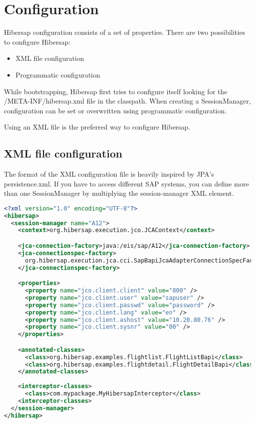 
\chapter{Configuration}
\label{cha:Configuration}

Hibersap configuration consists of a set of properties. 
There are two possibilities to configure Hibersap: 
\begin{itemize}
  \item XML file configuration 
  \item Programmatic configuration
\end{itemize}

While bootstrapping, Hibersap first tries to configure itself looking for the /META-INF/hibersap.xml file in the
classpath. When creating a SessionManager, configuration can be set or overwritten using programmatic configuration.

Using an XML file is the preferred way to configure Hibersap.


\section{XML file configuration}
\label{sec:XML file configuration}

The format of the XML configuration file is heavily inspired by JPA's persistence.xml.
If you have to access different SAP systems, you can define more than one SessionManager by multiplying the
session-manager XML element.

\begin{lstlisting}[language=XML,caption=hibersap.xml]
<?xml version="1.0" encoding="UTF-8"?>
<hibersap>
  <session-manager name="A12">
    <context>org.hibersap.execution.jco.JCAContext</context>

    <jca-connection-factory>java:/eis/sap/A12</jca-connection-factory>
    <jca-connectionspec-factory>
      org.hibersap.execution.jca.cci.SapBapiJcaAdapterConnectionSpecFactory
    </jca-connectionspec-factory>

    <properties>
      <property name="jco.client.client" value="800" />
      <property name="jco.client.user" value="sapuser" />
      <property name="jco.client.passwd" value="password" />
      <property name="jco.client.lang" value="en" />
      <property name="jco.client.ashost" value="10.20.80.76" />
      <property name="jco.client.sysnr" value="00" />
    </properties>

    <annotated-classes>
      <class>org.hibersap.examples.flightlist.FlightListBapi</class>
      <class>org.hibersap.examples.flightdetail.FlightDetailBapi</class>
    </annotated-classes>
    
    <interceptor-classes>
      <class>com.mypackage.MyHibersapInterceptor</class>
    <interceptor-classes>
  </session-manager>
</hibersap>
\end{lstlisting}

